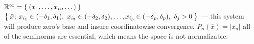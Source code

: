 \begin{ex}
  $\mathbb{R}^\infty = \Set{(x_1, \dotsc, x_n, \dotsc)}$ \\
  $\Set{\bar{x} \colon x_{i_1} \in (-\delta_1, \delta_1),\ x_{i_2} \in
    (-\delta_2, \delta_2), \dotsc, x_{i_p} \in (-\delta_p, \delta_p),\ \delta_j
    > 0}$ --- this system will produce zero's base and insure coordinatewise
  convergence. $P_n(\bar{x}) = |x_n|$ all of the seminorms are essential, which
  means the space is not normalizable.
\end{ex}

